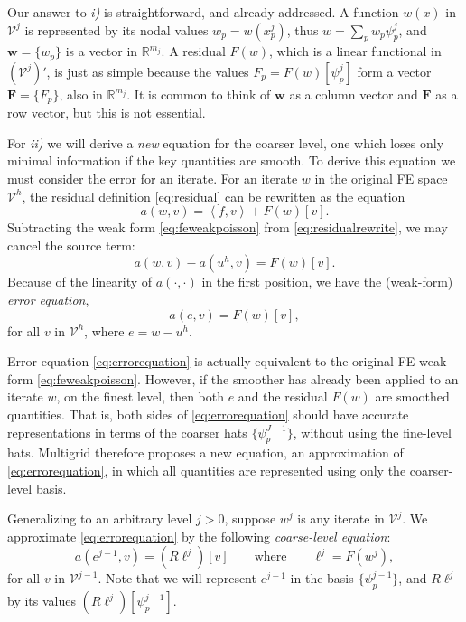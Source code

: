\documentclass[letterpaper,final,12pt,reqno]{amsart}
\theoremstyle{claim}
\newcommand{\RR}{\mathbb{R}}
\newcommand{\bw}{\mathbf{w}}
\newcommand{\bF}{\mathbf{F}}
\newcommand{\ip}[2]{\left<#1,#2\right>}
\numberwithin{equation}{section}
\numberwithin{figure}{section}
\numberwithin{table}{section}
\numberwithin{theorem}{section}
\begin{document}
Our answer to \emph{i)} is straightforward, and already addressed.  A function $w(x)$ in $\mathcal{V}^j$ is represented by its nodal values $w_p=w(x_p^j)$, thus $w = \sum_p w_p \psi_p^j$, and $\bw = \{w_p\}$ is a vector in $\RR^{m_j}$.  A residual $F(w)$, which is a linear functional in $(\mathcal{V}^j)'$, is just as simple because the values $F_p = F(w)[\psi_p^j]$ form a vector $\bF=\{F_p\}$, also in $\RR^{m_j}$.  It is common to think of $\bw$ as a column vector and $\bF$ as a row vector, but this is not essential.

For \emph{ii)} we will derive a \emph{new} equation for the coarser level, one which loses only minimal information if the key quantities are smooth.  To derive this equation we must consider the error for an iterate.  For an iterate $w$ in the original FE space $\mathcal{V}^h$, the residual definition \eqref{eq:residual} can be rewritten as the equation
\begin{equation}
  a(w,v) = \ip{f}{v} + F(w)[v].  \label{eq:residualrewrite}
\end{equation}
Subtracting the weak form \eqref{eq:feweakpoisson} from \eqref{eq:residualrewrite}, we may cancel the source term:
\begin{equation}
  a(w,v) - a(u^h,v) = F(w)[v].  \label{eq:errorequationearly}
\end{equation}
Because of the linearity of $a(\cdot,\cdot)$ in the first position, we have the (weak-form) \emph{error equation},
\begin{equation}
  a(e,v) = F(w)[v],  \label{eq:errorequation}
\end{equation}
for all $v$ in $\mathcal{V}^h$, where $e=w-u^h$.

Error equation \eqref{eq:errorequation} is actually equivalent to the original FE weak form \eqref{eq:feweakpoisson}.  However, if the smoother has already been applied to an iterate $w$, on the finest level, then both $e$ and the residual $F(w)$ are smoothed quantities.  That is, both sides of \eqref{eq:errorequation} should have accurate representations in terms of the coarser hats $\{\psi_p^{J-1}\}$, without using the fine-level hats.  Multigrid therefore proposes a new equation, an approximation of \eqref{eq:errorequation}, in which all quantities are represented using only the coarser-level basis.

Generalizing to an arbitrary level $j>0$, suppose $w^j$ is any iterate in $\mathcal{V}^j$.  We approximate \eqref{eq:errorequation} by the following \emph{coarse-level equation}:
\begin{equation}
  a(e^{j-1},v) = (R\ell^j)[v] \qquad \text{where} \qquad \ell^j = F(w^j),  \label{eq:coarsecorrection}
\end{equation}
for all $v$ in $\mathcal{V}^{j-1}$.  Note that we will represent $e^{j-1}$ in the basis $\{\psi_p^{j-1}\}$, and $R\ell^j$ by its values $(R\ell^j)[\psi_p^{j-1}]$.
\end{document}
